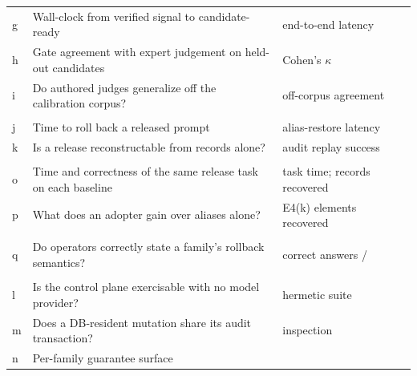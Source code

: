 \begin{table}[tbp]
\begin{tabular}{@{}L{0.52cm}L{7.20cm}L{3.66cm}L{2.16cm}@{}}
\addlinespace[0.2ex]
g & Wall-clock from verified signal to candidate-ready &
    end-to-end latency & \chipunmeasured{} \\
h & Gate agreement with expert judgement on held-out candidates &
    Cohen's $\kappa$~\cite{cohen1960kappa} & \chipunmeasured{} \\
i & Do authored judges generalize off the calibration corpus? &
    off-corpus agreement & \chipunmeasured{} \\
\midrule
{} \\
\addlinespace[0.2ex]
j & Time to roll back a released prompt & alias-restore latency & \chipunmeasured{} \\
k & Is a release reconstructable from records alone? &
    audit replay success & \chipunmeasured{} \\
\midrule
{} \\
\addlinespace[0.2ex]
o & Time and correctness of the same release task on each baseline &
    task time; records recovered & \chipunmeasured{} \\
p & What does an adopter gain over \mlflow{} aliases alone? &
    E4(k) elements recovered & \chipunmeasured{} \\
\midrule
{} \\
\addlinespace[0.2ex]
q & Do operators correctly state a family's rollback semantics? &
    correct answers / \family{} & \chipunmeasured{} \\
\midrule
{} \\
\addlinespace[0.2ex]
l & Is the control plane exercisable with no model provider? &
    hermetic suite & \chipyes{} \\
m & Does a DB-resident mutation share its audit transaction? &
    inspection & \chipyes{} \\
n & Per-family guarantee surface &  & \chipstated{} \\
\bottomrule
\end{tabular}
\end{table}

